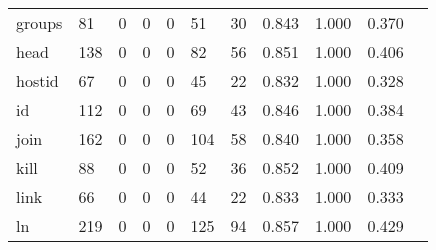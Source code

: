 \begin{longtable}{lp{1.10cm}p{1.10cm}p{1.10cm}p{1.10cm}p{1.10cm}p{1.10cm}p{1.10cm}p{1.10cm}p{1.10cm}p{1.10cm}}
groups    &                     81 &                                  0 &                                 0 &                                0 &                                51 &                              30 &                          0.843 &                                 1.000 &                               0.370 \\
head      &                    138 &                                  0 &                                 0 &                                0 &                                82 &                              56 &                          0.851 &                                 1.000 &                               0.406 \\
hostid    &                     67 &                                  0 &                                 0 &                                0 &                                45 &                              22 &                          0.832 &                                 1.000 &                               0.328 \\
id        &                    112 &                                  0 &                                 0 &                                0 &                                69 &                              43 &                          0.846 &                                 1.000 &                               0.384 \\
join      &                    162 &                                  0 &                                 0 &                                0 &                               104 &                              58 &                          0.840 &                                 1.000 &                               0.358 \\
kill      &                     88 &                                  0 &                                 0 &                                0 &                                52 &                              36 &                          0.852 &                                 1.000 &                               0.409 \\
link      &                     66 &                                  0 &                                 0 &                                0 &                                44 &                              22 &                          0.833 &                                 1.000 &                               0.333 \\
ln        &                    219 &                                  0 &                                 0 &                                0 &                               125 &                              94 &                          0.857 &                                 1.000 &                               0.429 \\

\end{longtable}
